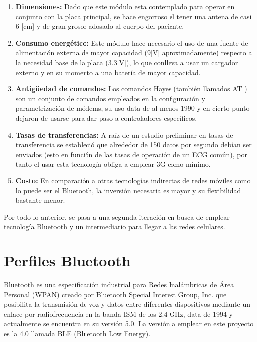 \begin{enumerate}
	\item\textbf{Dimensiones:}
	Dado que este módulo esta contemplado para operar en conjunto con la placa principal, se hace engorroso el tener una antena de casi 6 [cm] y de gran grosor adosado al cuerpo del paciente.
	\item\textbf{Consumo energético:}
	Este módulo hace necesario el uso de una fuente de alimentación externa de mayor capacidad (9[V] aproximadamente) respecto a la necesidad base de la placa (3.3[V]), lo que conlleva a usar un cargador externo y en su momento a una batería de mayor capacidad.
	\item\textbf{Antigüedad de comandos:}
	Los comandos Hayes (también llamados AT \cite{AT}) son un conjunto de comandos empleados en la configuración y parametrización de módems, su uso data de al menos 1990 y en cierto punto dejaron de usarse para dar paso a controladores específicos. 
	\item\textbf{Tasas de transferencias:}
	A raíz de un estudio preliminar en tasas de transferencia se estableció que alrededor de 150 datos por segundo debían ser enviados (esto en función de las tasas de operación de un ECG común\cite{ecg_rate}), por tanto el usar esta tecnología obliga a emplear 3G como mínimo. 
	\item\textbf{Costo:}
	En comparación a otras tecnologías indirectas de redes móviles como lo puede ser el Bluetooth, la inversión necesaria es mayor y su flexibilidad bastante menor.
\end{enumerate}

Por todo lo anterior, se pasa a una segunda iteración en busca de emplear tecnología Bluetooth y un intermediario para llegar a las redes celulares.\\


\section{Perfiles Bluetooth}

Bluetooth \cite{bluetooth} es una especificación industrial para Redes Inalámbricas de Área Personal (WPAN) creado por Bluetooth Special Interest Group, Inc. que posibilita la transmisión de voz y datos entre diferentes dispositivos mediante un enlace por radiofrecuencia en la banda ISM de los 2.4 GHz, data de 1994 y actualmente se encuentra en su versión 5.0. La versión a emplear en este proyecto es la 4.0 llamada BLE (Bluetooth Low Energy). \\

